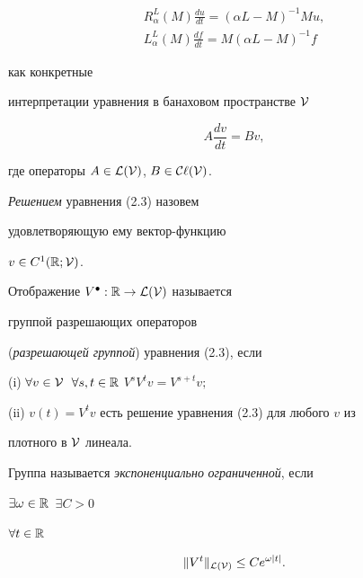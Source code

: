 \begin{gather}


R^L_\alpha (M) \frac{du}{dt}=(\alpha L-M)^{-1}Mu,\\


L^L_\alpha (M) \frac{df}{dt}=M(\alpha L-M)^{-1}f


\end{gather}


как конкретные


интерпретации уравнения в банаховом пространстве ${\cal V}$


\begin{equation}


A\frac{dv}{dt}=Bv,


\end{equation}


где операторы  $A\in {\cal L(\cal V)}$, $B\in {\cal C \ell(\cal V)}$.





{\it Решением} уравнения (2.3) назовем


удовлетворяющую ему вектор-функцию


$v\in C^1({\Bbb R};{\cal V})$.





\begin{defns} Отображение $V^{\bullet}:


{\Bbb R}\to {\cal L(\cal V)}$ называется {\it


группой разрешающих операторов}


({\it разрешающей группой}) уравнения (2.3), если





(i) $\forall v\in {\cal V}$\, $


\forall s,t \in {\Bbb R}$\; $ V^sV^tv=V^{s+t}v;$





(ii) $v(t)=V^tv$ есть решение уравнения (2.3) для любого $v$ из


плотного в ${\cal V}$ линеала.





Группа называется {\it экспоненциально} {\it ограниченной}, если


$\exists \omega \in {\Bbb R}$\, $\exists C>0$\,


$\forall t \in {\Bbb R}$


$$


\| V^t \|_{\cal L(\cal V)} \le Ce^{\omega |t|}.


$$


\end{defns}





